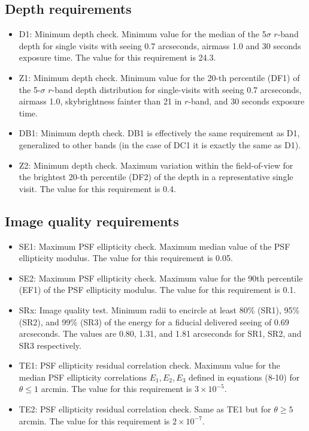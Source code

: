 \documentclass[\docopts]{\docclass}
\begin{document}
\subsection{Depth requirements}
\begin{itemize}
\item D1: Minimum depth check. Minimum value for the median of the 5$\sigma$ $r$-band depth for single visits with seeing 0.7 arcseconds, airmass 1.0 and 30 seconds exposure time. The value for this requirement is 24.3.
\item Z1: Minimum depth check. Minimum value for the 20-th percentile (DF1) of the 5-$\sigma$ $r$-band depth distribution for single-visits with seeing 0.7 arcseconds, airmass 1.0, skybrightness fainter than 21 in $r$-band, and 30 seconds exposure time.
\item DB1: Minimum depth check. DB1 is effectively the same requirement as D1, generalized to other bands (in the case of DC1 it is exactly the same as D1).
\item Z2: Minimum depth check. Maximum variation within the field-of-view for the brightest 20-th percentile (DF2) of the depth in a representative single visit. The value for this requirement is 0.4.
\end{itemize}

\subsection{Image quality requirements}
\begin{itemize}

\item SE1: Maximum PSF ellipticity check. Maximum median value of the PSF ellipticity modulus. The value for this requirement is 0.05.
\item SE2: Maximum PSF ellipticity check. Maximum value for the 90th percentile (EF1) of the PSF ellipticity modulus. The value for this requirement is 0.1.
\item SRx: Image quality test. Minimum radii to encircle at least 80\% (SR1), 95\% (SR2), and 99\% (SR3) of the energy for a fiducial delivered seeing of 0.69 arcseconds. The values are 0.80, 1.31, and 1.81 arcseconds for SR1, SR2, and SR3 respectively.
\item TE1: PSF ellipticity residual correlation check. Maximum value for the median PSF ellipticity correlations $E_{1}, E_{2}, E_{3}$ defined in equations (8-10) for $\theta \leq 1$ arcmin. The value for this requirement is $3 \times 10^{-5}$.
\item TE2: PSF ellipticity residual correlation check. Same as TE1 but for $\theta \geq 5$ arcmin. The value for this requirement is $2 \times 10^{-7}$. 
\end{itemize}
\end{document}

